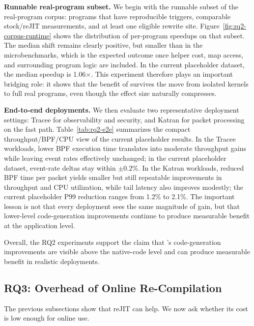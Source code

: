 \noindent\textbf{Runnable real-program subset.}
We begin with the runnable subset of the real-program corpus: programs that have reproducible triggers, comparable stock/reJIT measurements, and at least one eligible rewrite site. Figure~\ref{fig:rq2-corpus-runtime} shows the distribution of per-program speedups on that subset. The median shift remains clearly positive, but smaller than in the microbenchmarks, which is the expected outcome once helper cost, map access, and surrounding program logic are included. In the current placeholder dataset, the median speedup is 1.06$\times$. This experiment therefore plays an important bridging role: it shows that the benefit of \tool survives the move from isolated kernels to full real programs, even though the effect size naturally compresses.



\noindent\textbf{End-to-end deployments.}
We then evaluate two representative deployment settings: Tracee for observability and security, and Katran for packet processing on the fast path. Table~\ref{tab:rq2-e2e} summarizes the compact throughput/BPF/CPU view of the current placeholder results. In the Tracee workloads, lower BPF execution time translates into moderate throughput gains while leaving event rates effectively unchanged; in the current placeholder dataset, event-rate deltas stay within $\pm 0.2\%$. In the Katran workloads, reduced BPF time per packet yields smaller but still repeatable improvements in throughput and CPU utilization, while tail latency also improves modestly; the current placeholder P99 reduction ranges from 1.2\% to 2.1\%. The important lesson is not that every deployment sees the same magnitude of gain, but that lower-level code-generation improvements continue to produce measurable benefit at the application level.



Overall, the RQ2 experiments support the claim that \tool's code-generation improvements are visible above the native-code level and can produce measurable benefit in realistic deployments.

\subsection{RQ3: Overhead of Online Re-Compilation}
\label{subsec:rq3}

The previous subsections show that reJIT can help. We now ask whether its cost is low enough for online use.

